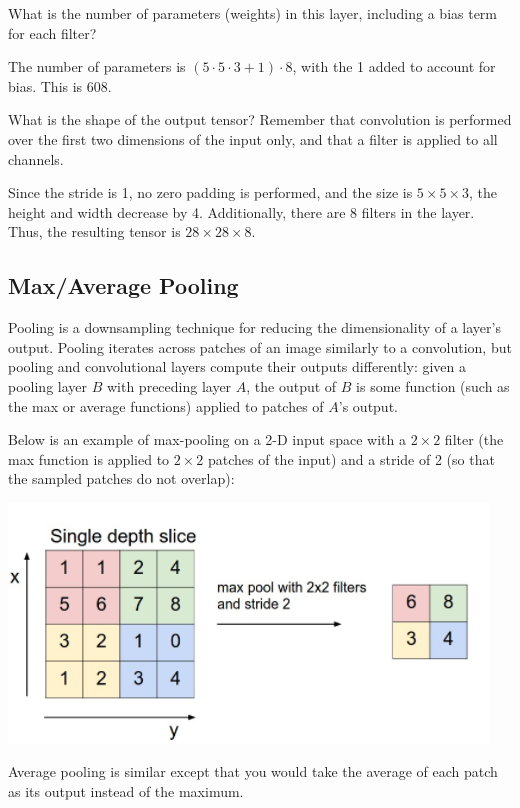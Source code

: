 \problem[2] What is the number of parameters (weights) in this layer, including a bias term for each filter?

\begin{solution}
    The number of parameters is $(5 \cdot 5 \cdot 3 + 1) \cdot 8$, with the 1 added to account for bias. This is $\boxed{608}$.
\end{solution}

\problem[3] What is the shape of the output tensor? Remember that convolution is performed over the first two dimensions of the input only, and that a filter is applied to all channels.

\begin{solution}
    Since the stride is 1, no zero padding is performed, and the size is $5 \times 5 \times 3$, the height and width decrease by 4. Additionally, there are 8 filters in the layer. Thus, the resulting tensor is $28 \times 28 \times 8$.
\end{solution}

 \subsection{Max/Average Pooling}

Pooling is a downsampling technique for reducing the dimensionality of a layer's output. Pooling iterates across patches of an image similarly to a convolution, but pooling and convolutional layers compute their outputs differently: given a pooling layer $B$ with preceding layer $A$, the output of $B$ is some function (such as the max or average functions) applied to patches of $A$'s output.

Below is an example of max-pooling on a 2-D input space with a $2\times 2$ filter (the max function is applied to $2\times 2$ patches of the input) and a stride of 2 (so that the sampled patches do not overlap):

\begin{center}
    \includegraphics[width=.49\textwidth]{Plots/MaxPool.png}
\end{center}

Average pooling is similar except that you would take the average of each patch as its output instead of the maximum.

